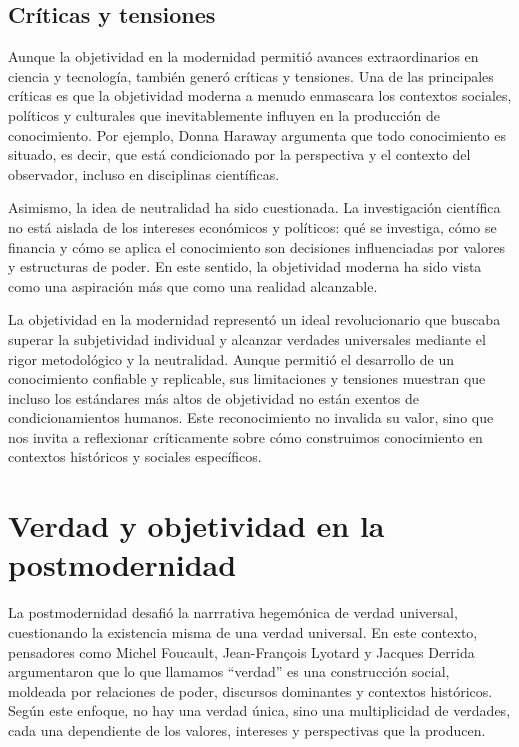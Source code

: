 \documentclass[
  letterpaper,
  DIV=11,
  numbers=noendperiod]{scrreprt}
\begin{document}
\subsection{Críticas y tensiones}\label{cruxedticas-y-tensiones}

Aunque la objetividad en la modernidad permitió avances extraordinarios
en ciencia y tecnología, también generó críticas y tensiones. Una de las
principales críticas es que la objetividad moderna a menudo enmascara
los contextos sociales, políticos y culturales que inevitablemente
influyen en la producción de conocimiento. Por ejemplo, Donna Haraway
argumenta que todo conocimiento es situado, es decir, que está
condicionado por la perspectiva y el contexto del observador, incluso en
disciplinas científicas.

Asimismo, la idea de neutralidad ha sido cuestionada. La investigación
científica no está aislada de los intereses económicos y políticos: qué
se investiga, cómo se financia y cómo se aplica el conocimiento son
decisiones influenciadas por valores y estructuras de poder. En este
sentido, la objetividad moderna ha sido vista como una aspiración más
que como una realidad alcanzable.

La objetividad en la modernidad representó un ideal revolucionario que
buscaba superar la subjetividad individual y alcanzar verdades
universales mediante el rigor metodológico y la neutralidad. Aunque
permitió el desarrollo de un conocimiento confiable y replicable, sus
limitaciones y tensiones muestran que incluso los estándares más altos
de objetividad no están exentos de condicionamientos humanos. Este
reconocimiento no invalida su valor, sino que nos invita a reflexionar
críticamente sobre cómo construimos conocimiento en contextos históricos
y sociales específicos.

\section{Verdad y objetividad en la
postmodernidad}\label{verdad-y-objetividad-en-la-postmodernidad}

La postmodernidad desafió la narrrativa hegemónica de verdad universal,
cuestionando la existencia misma de una verdad universal. En este
contexto, pensadores como Michel Foucault, Jean-François Lyotard y
Jacques Derrida argumentaron que lo que llamamos ``verdad'' es una
construcción social, moldeada por relaciones de poder, discursos
dominantes y contextos históricos. Según este enfoque, no hay una verdad
única, sino una multiplicidad de verdades, cada una dependiente de los
valores, intereses y perspectivas que la producen.
\end{document}
